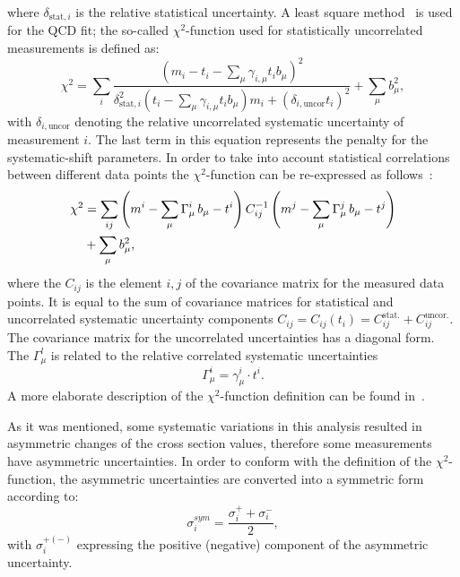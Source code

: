 where $\delta_{\text{stat},i}$ is the relative statistical uncertainty. A least square method~\cite{Behnke:2013pga} is used for the QCD fit; the so-called $\chi^2$-function used for statistically uncorrelated measurements is defined as:
\begin{equation}
 \chi^2 = \sum_i{ \frac{\left( m_i-t_i-\sum_{\mu}{\gamma_{i,\mu} t_i b_\mu} \right)^2 }{ \delta_{\text{stat},i}^2\left( t_i - \sum_\mu{\gamma_{i,\mu}t_ib_\mu} \right)m_i + \left( \delta_{i,\text{uncor}}t_i\right)^2 } } + \sum_{\mu}{b_\mu^2},
 \label{eq:chi2uncorr}
\end{equation}
with $\delta_{i,\text{uncor}}$ denoting the relative uncorrelated systematic uncertainty of measurement $i$. The last term in this equation represents the penalty for the systematic-shift parameters. In order to take into account statistical correlations between different data points the $\chi^2$-function can be re-expressed as follows~\cite{Aaron:2009aa}:
\begin{align}
 \chi^2 &= \sum_{ij}{\left( m^i -\sum_{\mu}{\Gamma_\mu^i\,b_\mu - t^i }\right) C^{-1}_{ij} \left( m^j -\sum_{\mu}{\Gamma_\mu^j\,b_\mu - t^j }\right) }\notag\\
                                           &+ \sum_{\mu}{b_\mu^2},
 \label{eq:chi2corr}
\end{align}
where the $C_{ij}$ is the element $i,j$ of the covariance matrix for the measured data points. It is equal to the sum of covariance matrices for statistical and uncorrelated systematic uncertainty components $C_{ij}=C_{ij}\left(t_i\right)=C_{ij}^{\text{stat.}}+C_{ij}^{\text{uncor.}}$. The covariance matrix for the uncorrelated uncertainties has a diagonal form. The $\Gamma_\mu^l$ is related to the relative correlated systematic uncertainties
\begin{equation}
 \Gamma_{\mu}^i = \gamma_{\mu}^i \cdot t^i. 
\end{equation}
A more elaborate description of the $\chi^2$-function definition can be found in~\cite{herafitter:2014:manual}.

As it was mentioned, some systematic variations in this analysis resulted in asymmetric changes of the cross section values, therefore some measurements have asymmetric uncertainties. In order to conform with the definition of the $\chi^2$-function, the asymmetric uncertainties are converted into a symmetric form according to:
\begin{equation}
 \sigma_i^{sym} = \frac{\sigma_i^+ + \sigma_i^-}{2},
\end{equation}
with $\sigma_i^{+\left(-\right)}$ expressing the positive (negative) component of the asymmetric uncertainty.

